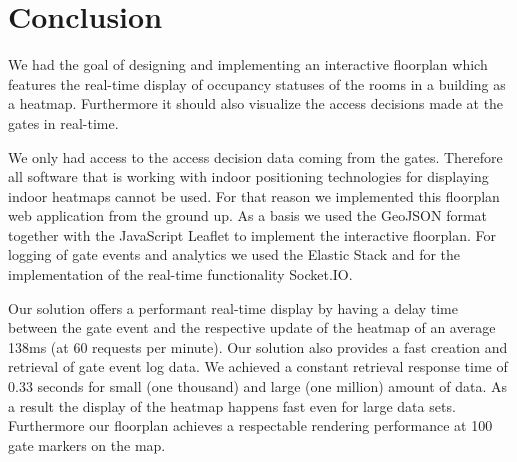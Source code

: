 \section{Conclusion}
We had the goal of designing and implementing an interactive floorplan which features the real-time display of occupancy statuses of the rooms in a building as a heatmap. Furthermore it should also visualize the access decisions made at the gates in real-time. 

We only had access to the access decision data coming from the gates. Therefore all software that is working with indoor positioning technologies for displaying indoor heatmaps cannot be used. For that reason we implemented this floorplan web application from the ground up. As a basis we used the GeoJSON format together with the JavaScript Leaflet to implement the interactive floorplan. For logging of gate events and analytics we used the Elastic Stack and for the implementation of the real-time functionality Socket.IO. 

Our solution offers a performant real-time display by having a delay time between the gate event and the respective update of the heatmap of an average 138ms (at 60 requests per minute).
Our solution also provides a fast creation and retrieval of gate event log data. We achieved a constant retrieval response time of 0.33 seconds for small (one thousand) and large (one million) amount of data. As a result the display of the heatmap happens fast even for large data sets. Furthermore our floorplan achieves a respectable rendering performance at 100 gate markers on the map.

\clearpage

